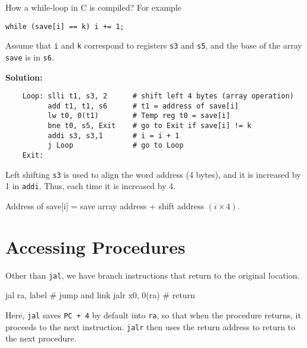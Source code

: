 \begin{eg}
  How a while-loop in C is compiled? For example 
  \begin{center}
    \verb|while (save[i] == k) i += 1;|
  \end{center}
  Assume that \verb|i| and \verb|k| correspond to registers \verb|s3| and \verb|s5|, and the base of the array \verb|save| is in \verb|s6|.

  \textbf{Solution:} 
  \color{red}
  \begin{verbatim}
    Loop: slli t1, s3, 2      # shift left 4 bytes (array operation)
          add t1, t1, s6      # t1 = address of save[i]
          lw t0, 0(t1)        # Temp reg t0 = save[i]
          bne t0, s5, Exit    # go to Exit if save[i] != k
          addi s3, s3,1       # i = i + 1
          j Loop              # go to Loop
    Exit:
  \end{verbatim}

  \begin{remark}
    Left shifting \verb|s3| is used to align the word address (4 bytes), and it is increased by 1 in \verb|addi|. Thus, each time it is increased by 4.

    Address of save[i] = save array address + shift address \((i \times 4)\).
  \end{remark}
\end{eg}

\newpage
\section{Accessing Procedures}
Other than \verb|jal|, we have branch instructions that return to the original location.
\begin{codeBlock}
  jal ra, label   # jump and link
  jalr x0, 0(ra)  # return
\end{codeBlock}

Here, \verb|jal| saves \verb|PC + 4| by default into \verb|ra|, so that when the procedure returns, it proceeds to the next instruction. \verb|jalr| then uses the return address to return to the next procedure.

